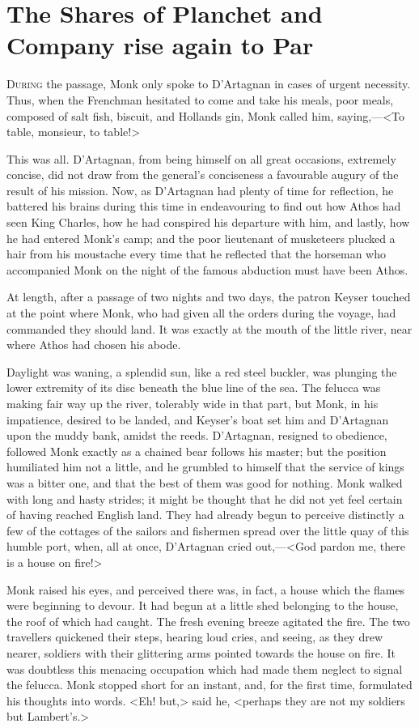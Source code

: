 \chapter{The Shares of Planchet and Company rise again to Par}

\lettrine{D}{uring} the passage, Monk only spoke to D'Artagnan in cases of urgent necessity. Thus, when the Frenchman hesitated to come and take his meals, poor meals, composed of salt fish, biscuit, and Hollands gin, Monk called him, saying,—<To table, monsieur, to table!>

This was all. D'Artagnan, from being himself on all great occasions, extremely concise, did not draw from the general's conciseness a favourable augury of the result of his mission. Now, as D'Artagnan had plenty of time for reflection, he battered his brains during this time in endeavouring to find out how Athos had seen King Charles, how he had conspired his departure with him, and lastly, how he had entered Monk's camp; and the poor lieutenant of musketeers plucked a hair from his moustache every time that he reflected that the horseman who accompanied Monk on the night of the famous abduction must have been Athos.

At length, after a passage of two nights and two days, the patron Keyser touched at the point where Monk, who had given all the orders during the voyage, had commanded they should land. It was exactly at the mouth of the little river, near where Athos had chosen his abode.

Daylight was waning, a splendid sun, like a red steel buckler, was plunging the lower extremity of its disc beneath the blue line of the sea. The felucca was making fair way up the river, tolerably wide in that part, but Monk, in his impatience, desired to be landed, and Keyser's boat set him and D'Artagnan upon the muddy bank, amidst the reeds. D'Artagnan, resigned to obedience, followed Monk exactly as a chained bear follows his master; but the position humiliated him not a little, and he grumbled to himself that the service of kings was a bitter one, and that the best of them was good for nothing. Monk walked with long and hasty strides; it might be thought that he did not yet feel certain of having reached English land. They had already begun to perceive distinctly a few of the cottages of the sailors and fishermen spread over the little quay of this humble port, when, all at once, D'Artagnan cried out,—<God pardon me, there is a house on fire!>

Monk raised his eyes, and perceived there was, in fact, a house which the flames were beginning to devour. It had begun at a little shed belonging to the house, the roof of which had caught. The fresh evening breeze agitated the fire. The two travellers quickened their steps, hearing loud cries, and seeing, as they drew nearer, soldiers with their glittering arms pointed towards the house on fire. It was doubtless this menacing occupation which had made them neglect to signal the felucca. Monk stopped short for an instant, and, for the first time, formulated his thoughts into words. <Eh! but,> said he, <perhaps they are not my soldiers but Lambert's.>

